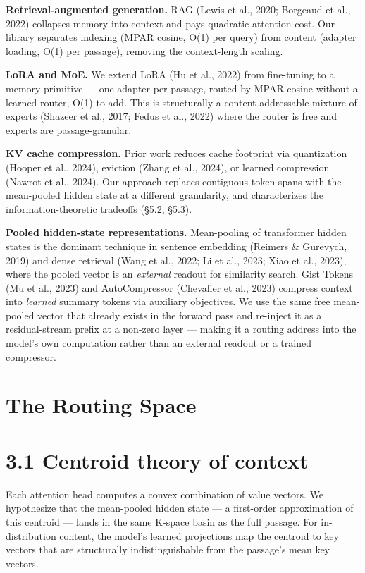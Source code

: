 \textbf{Retrieval-augmented generation.} RAG (Lewis et al., 2020; Borgeaud et al., 2022) collapses memory into context and pays quadratic attention cost. Our library separates indexing (MPAR cosine, O(1) per query) from content (adapter loading, O(1) per passage), removing the context-length scaling.

\textbf{LoRA and MoE.} We extend LoRA (Hu et al., 2022) from fine-tuning to a memory primitive --- one adapter per passage, routed by MPAR cosine without a learned router, O(1) to add. This is structurally a content-addressable mixture of experts (Shazeer et al., 2017; Fedus et al., 2022) where the router is free and experts are passage-granular.

\textbf{KV cache compression.} Prior work reduces cache footprint via quantization (Hooper et al., 2024), eviction (Zhang et al., 2024), or learned compression (Nawrot et al., 2024). Our approach replaces contiguous token spans with the mean-pooled hidden state at a different granularity, and characterizes the information-theoretic tradeoffs (§5.2, §5.3).

\textbf{Pooled hidden-state representations.} Mean-pooling of transformer hidden states is the dominant technique in sentence embedding (Reimers \& Gurevych, 2019) and dense retrieval (Wang et al., 2022; Li et al., 2023; Xiao et al., 2023), where the pooled vector is an \emph{external} readout for similarity search. Gist Tokens (Mu et al., 2023) and AutoCompressor (Chevalier et al., 2023) compress context into \emph{learned} summary tokens via auxiliary objectives. We use the same free mean-pooled vector that already exists in the forward pass and re-inject it as a residual-stream prefix at a non-zero layer --- making it a routing address into the model's own computation rather than an external readout or a trained compressor.

\section{The Routing Space}\label{the-routing-space}

\section{3.1 Centroid theory of context}\label{centroid-theory-of-context}

Each attention head computes a convex combination of value vectors. We hypothesize that the mean-pooled hidden state --- a first-order approximation of this centroid --- lands in the same K-space basin as the full passage. For in-distribution content, the model's learned projections map the centroid to key vectors that are structurally indistinguishable from the passage's mean key vectors.

